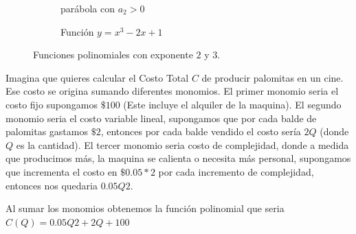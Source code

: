 \begin{figure}[htbp]
    \begin{subfigure}[b]{0.48\textwidth}
        \centering
        \caption{parábola con $a_2 > 0$}
        \label{type_funcion_cuadratica}
    \end{subfigure}
    \hfill
    \begin{subfigure}[b]{0.48\textwidth}
        \centering
        \caption{Función $y = x^3 - 2x + 1$}
        \label{type_funcion_cubica}
    \end{subfigure}
    \caption{Funciones polinomiales con exponente \(2\) y \(3\).}
    \label{funcion_cuadratica_y_cubica}
\end{figure}

\begin{ejemplo}
    \label{ejemplo_1.1.4}
    Imagina que quieres calcular el Costo Total \(C\) de producir palomitas en un cine. Ese costo se origina sumando diferentes monomios. El primer monomio seria el costo fijo supongamos \(\mathdollar100\) (Este incluye el alquiler de la maquina). El segundo monomio seria el costo variable lineal, supongamos que por cada balde de palomitas gastamos \(\mathdollar2\), entonces por cada balde vendido el costo sería \(2Q\) (donde \(Q\) es la cantidad). El tercer monomio seria costo de complejidad, donde a medida que producimos más, la maquina se calienta o necesita más personal, supongamos que incrementa el costo en \(\mathdollar0.05*2\) por cada incremento de complejidad, entonces nos quedaria \(0.05Q2\). 

    Al sumar los monomios obtenemos la función polinomial que seria \(C(Q)=0.05Q2+2Q+100\)
\end{ejemplo}



